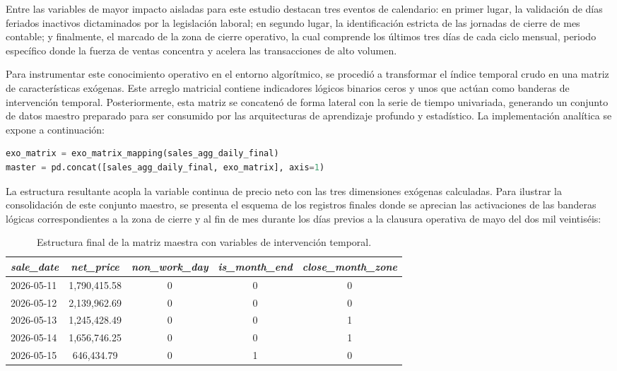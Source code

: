 \documentclass[11pt,a4paper]{report}
\begin{document}
Entre las variables de mayor impacto aisladas para este estudio destacan tres eventos de calendario: en primer lugar, la validación de días feriados inactivos dictaminados por la legislación laboral; en segundo lugar, la identificación estricta de las jornadas de cierre de mes contable; y finalmente, el marcado de la zona de cierre operativo, la cual comprende los últimos tres días de cada ciclo mensual, periodo específico donde la fuerza de ventas concentra y acelera las transacciones de alto volumen.

Para instrumentar este conocimiento operativo en el entorno algorítmico, se procedió a transformar el índice temporal crudo en una matriz de características exógenas. Este arreglo matricial contiene indicadores lógicos binarios ceros y unos que actúan como banderas de intervención temporal. Posteriormente, esta matriz se concatenó de forma lateral con la serie de tiempo univariada, generando un conjunto de datos maestro preparado para ser consumido por las arquitecturas de aprendizaje profundo y estadístico. La implementación analítica se expone a continuación:

\begin{lstlisting}[language=Python, caption=Creación y concatenación de la matriz de características exógenas.]
exo_matrix = exo_matrix_mapping(sales_agg_daily_final)
master = pd.concat([sales_agg_daily_final, exo_matrix], axis=1)
\end{lstlisting}

La estructura resultante acopla la variable continua de precio neto con las tres dimensiones exógenas calculadas. Para ilustrar la consolidación de este conjunto maestro, se presenta el esquema de los registros finales donde se aprecian las activaciones de las banderas lógicas correspondientes a la zona de cierre y al fin de mes durante los días previos a la clausura operativa de mayo del dos mil veintiséis:

\begin{table}[H]
    \centering
    \caption{Estructura final de la matriz maestra con variables de intervención temporal.}
    \vspace{0.2cm}
    \begin{tabular}{l c c c c}
        \hline
        \textit{sale\_date} & \textit{net\_price} & \textit{non\_work\_day} & \textit{is\_month\_end} & \textit{close\_month\_zone} \\
        \hline
        2026-05-11 & 1,790,415.58 & 0 & 0 & 0 \\
        2026-05-12 & 2,139,962.69 & 0 & 0 & 0 \\
        2026-05-13 & 1,245,428.49 & 0 & 0 & 1 \\
        2026-05-14 & 1,656,746.25 & 0 & 0 & 1 \\
        2026-05-15 & 646,434.79   & 0 & 1 & 0 \\
        \hline
    \end{tabular}
    \label{tab:matriz_maestra}
\end{table}
\end{document}
